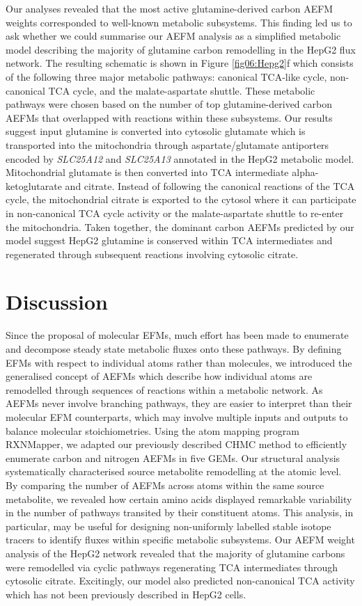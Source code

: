 \documentclass[12pt]{article}
\begin{document}
Our analyses revealed that the most active glutamine-derived carbon AEFM
weights corresponded to well-known metabolic subsystems. This finding led
us to ask whether we could summarise our AEFM analysis as a simplified
metabolic model describing the majority of glutamine carbon remodelling in
the HepG2 flux network. The resulting schematic is shown in Figure
\ref{fig06:Hepg2}f which consists of the following three major metabolic
pathways: canonical TCA-like cycle, non-canonical TCA cycle, and the
malate-aspartate shuttle. These metabolic pathways were chosen based on
the number of top glutamine-derived carbon AEFMs that overlapped with
reactions within these subsystems. Our results suggest input glutamine is
converted into cytosolic glutamate which is transported into the
mitochondria through aspartate/glutamate antiporters encoded by
\textit{SLC25A12} and \textit{SLC25A13} annotated in the HepG2 metabolic
model. Mitochondrial glutamate is then converted into TCA intermediate
alpha-ketoglutarate and citrate. Instead of following the canonical
reactions of the TCA cycle, the mitochondrial citrate is exported to the
cytosol where it can participate in non-canonical TCA cycle activity or
the malate-aspartate shuttle to re-enter the mitochondria. Taken together,
the dominant carbon AEFMs predicted by our model suggest HepG2 glutamine
is conserved within TCA intermediates and regenerated through subsequent
reactions involving cytosolic citrate.

\section*{Discussion}

Since the proposal of molecular EFMs, much effort has been made to
enumerate and decompose steady state metabolic fluxes onto these pathways. 
By defining EFMs with respect to individual atoms rather than molecules,
we introduced the generalised concept of AEFMs which describe how
individual atoms are remodelled through sequences of reactions within
a metabolic network. As AEFMs never involve branching pathways, they are
easier to interpret than their molecular EFM counterparts, which may
involve multiple inputs and outputs to balance molecular stoichiometries.
Using the atom mapping program RXNMapper, we adapted our previously
described CHMC method to efficiently enumerate carbon and nitrogen AEFMs
in five GEMs. Our structural analysis systematically characterised source
metabolite remodelling at the atomic level. By comparing the number of
AEFMs across atoms within the same source metabolite, we revealed how
certain amino acids displayed remarkable variability in the number of
pathways transited by their constituent atoms. This analysis, in
particular, may be useful for designing non-uniformly labelled stable
isotope tracers to identify fluxes within specific metabolic subsystems.
Our AEFM weight analysis of the HepG2 network revealed that the majority
of glutamine carbons were remodelled via cyclic pathways regenerating TCA
intermediates through cytosolic citrate. Excitingly, our model also
predicted non-canonical TCA activity which has not been previously
described in HepG2 cells.
\end{document}
